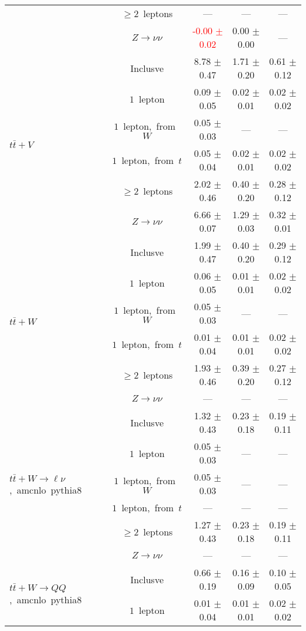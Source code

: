 \documentclass{article}
\begin{document}
\begin{longtable}{|l|c|c|c|c|}
 & $\ge2$~leptons  & ---  & ---  & --- \\* 
 & $Z\rightarrow\nu\nu$  & \textcolor{red}{ -0.00 $\pm$ 0.02 }  & 0.00 $\pm$ 0.00  & --- \\* 
\hline 
\multirow{6}{*}{$t\bar{t}+V$} & Inclusve  & 8.78 $\pm$ 0.47  & 1.71 $\pm$ 0.20  & 0.61 $\pm$ 0.12 \\* 
 & $1$~lepton  & 0.09 $\pm$ 0.05  & 0.02 $\pm$ 0.01  & 0.02 $\pm$ 0.02 \\* 
 & $1$~lepton,~from~$W$  & 0.05 $\pm$ 0.03  & ---  & --- \\* 
 & $1$~lepton,~from~$t$  & 0.05 $\pm$ 0.04  & 0.02 $\pm$ 0.01  & 0.02 $\pm$ 0.02 \\* 
 & $\ge2$~leptons  & 2.02 $\pm$ 0.46  & 0.40 $\pm$ 0.20  & 0.28 $\pm$ 0.12 \\* 
 & $Z\rightarrow\nu\nu$  & 6.66 $\pm$ 0.07  & 1.29 $\pm$ 0.03  & 0.32 $\pm$ 0.01 \\* 
\hline 
\multirow{6}{*}{$t\bar{t}+W$} & Inclusve  & 1.99 $\pm$ 0.47  & 0.40 $\pm$ 0.20  & 0.29 $\pm$ 0.12 \\* 
 & $1$~lepton  & 0.06 $\pm$ 0.05  & 0.01 $\pm$ 0.01  & 0.02 $\pm$ 0.02 \\* 
 & $1$~lepton,~from~$W$  & 0.05 $\pm$ 0.03  & ---  & --- \\* 
 & $1$~lepton,~from~$t$  & 0.01 $\pm$ 0.04  & 0.01 $\pm$ 0.01  & 0.02 $\pm$ 0.02 \\* 
 & $\ge2$~leptons  & 1.93 $\pm$ 0.46  & 0.39 $\pm$ 0.20  & 0.27 $\pm$ 0.12 \\* 
 & $Z\rightarrow\nu\nu$  & ---  & ---  & --- \\* 
\hline 
\multirow{6}{*}{$t\bar{t}+W{\rightarrow}{\ell}{\nu}$,~amcnlo~pythia8} & Inclusve  & 1.32 $\pm$ 0.43  & 0.23 $\pm$ 0.18  & 0.19 $\pm$ 0.11 \\* 
 & $1$~lepton  & 0.05 $\pm$ 0.03  & ---  & --- \\* 
 & $1$~lepton,~from~$W$  & 0.05 $\pm$ 0.03  & ---  & --- \\* 
 & $1$~lepton,~from~$t$  & ---  & ---  & --- \\* 
 & $\ge2$~leptons  & 1.27 $\pm$ 0.43  & 0.23 $\pm$ 0.18  & 0.19 $\pm$ 0.11 \\* 
 & $Z\rightarrow\nu\nu$  & ---  & ---  & --- \\* 
\hline 
\multirow{6}{*}{$t\bar{t}+W{\rightarrow}QQ$,~amcnlo~pythia8} & Inclusve  & 0.66 $\pm$ 0.19  & 0.16 $\pm$ 0.09  & 0.10 $\pm$ 0.05 \\* 
 & $1$~lepton  & 0.01 $\pm$ 0.04  & 0.01 $\pm$ 0.01  & 0.02 $\pm$ 0.02 \\* 

\end{longtable}
\end{document}
